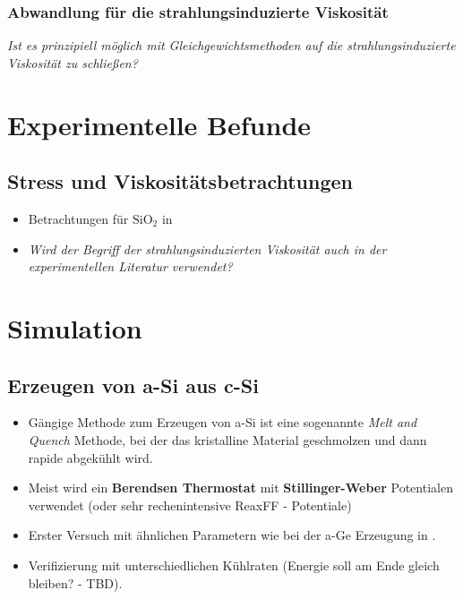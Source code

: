 \documentclass[a4paper, 10pt, 
               numbers=noenddot, toc=graduated,
               headsepline=true, footsepline=true,
               twoside=false, titlepage=true, 
               bibliography=totoc]{scrartcl}
\begin{document}
	\subsubsection{Abwandlung für die strahlungsinduzierte Viskosität}
	\textit{Ist es prinzipiell möglich mit Gleichgewichtsmethoden auf die strahlungsinduzierte Viskosität zu schließen?}

\section{Experimentelle Befunde}

\subsection{Stress und Viskositätsbetrachtungen}
	\begin{itemize}
		\item Betrachtungen für $\mathrm{SiO_2}$ in \cite{Snoeks2000}
		\item \textit{Wird der Begriff der strahlungsinduzierten Viskosität auch in der experimentellen Literatur verwendet?}
	\end{itemize}

\section{Simulation}

\subsection{Erzeugen von a-Si aus c-Si}
	\begin{itemize}
		\item Gängige Methode zum Erzeugen von a-Si ist eine sogenannte \textit{Melt and Quench} Methode, bei der das kristalline Material geschmolzen und dann rapide abgekühlt wird.
		\item Meist wird ein \textbf{Berendsen Thermostat} mit \textbf{Stillinger-Weber} Potentialen verwendet (oder sehr rechenintensive ReaxFF - Potentiale)
		\item Erster Versuch mit ähnlichen Parametern wie bei der a-Ge Erzeugung in \cite{Mayr2005}.
		\item Verifizierung mit unterschiedlichen Kühlraten (Energie soll am Ende gleich bleiben? - TBD).
	\end{itemize}



\end{document}
